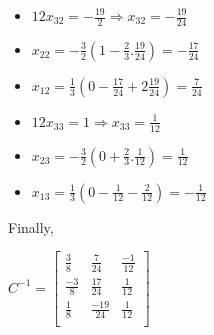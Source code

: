\documentclass[12pt]{article}
\begin{document}
\begin{itemize}
\item $12x_{32} = -\frac{19}{2} \Rightarrow x_{32} = -\frac{19}{24}$
\item $x_{22} = -\frac{3}{2}(1-\frac{2}{3}.\frac{19}{24}) = -\frac{17}{24}$
\item $x_{12} = \frac{1}{3}(0-\frac{17}{24}+2\frac{19}{24}) = \frac{7}{24}$
\end{itemize}

\begin{itemize}
\item $12x_{33} = 1 \Rightarrow x_{33} = \frac{1}{12}$
\item $x_{23} = -\frac{3}{2}(0+\frac{2}{3}.\frac{1}{12}) = \frac{1}{12}$
\item $x_{13} = \frac{1}{3}(0-\frac{1}{12}-\frac{2}{12}) = -\frac{1}{12}$
\end{itemize}

Finally,
\begin{center}
$C^{-1} = \begin{bmatrix}
\frac{3}{8} & \frac{7}{24} & \frac{-1}{12} \\
\frac{-3}{8} & \frac{17}{24} & \frac{1}{12} \\
\frac{1}{8} & \frac{-19}{24} & \frac{1}{12} \\
\end{bmatrix}
$
\end{center}
\end{document}
